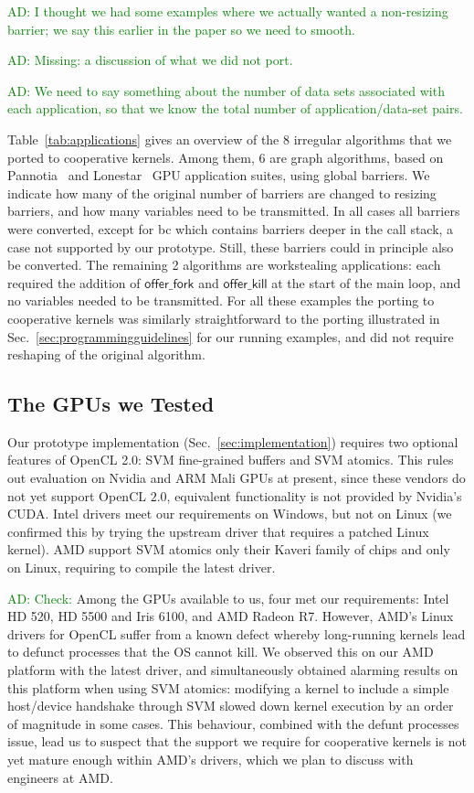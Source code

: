 \documentclass[numbers,nocopyrightspace,10pt]{sigplanconf}
\newcommand{\ADComment}[1]{\textcolor{green}{AD: #1}}
\newcommand{\mytablong}{Table~}
\newcommand{\mysec}{Sec.~}
\newcommand{\nvidia}{Nvidia\xspace}
\newcommand{\offerfork}{\mathsf{offer\_fork}}
\newcommand{\offerkill}{\mathsf{offer\_kill}}
\begin{document}
\ADComment{I thought we had some examples where we actually wanted a non-resizing barrier; we say this earlier in the paper so we need to smooth.}

\ADComment{Missing: a discussion of what we did not port.}

\ADComment{We need to say something about the number of data sets
  associated with each application, so that we know the total number
  of application/data-set pairs.}

\mytablong\ref{tab:applications} gives an overview of the 8 irregular
algorithms that we ported to cooperative kernels. Among them, 6 are
graph algorithms, based on Pannotia~\cite{...} and Lonestar~\cite{...} GPU application suites,
using global barriers.  We indicate how many of the original number of barriers are changed to resizing barriers, and how many variables need to
be transmitted.  In all cases all barriers were converted, except for bc
which contains barriers deeper in the call stack, a case not supported
by our prototype. Still, these barriers could in principle also be
converted.  The remaining 2 algorithms are workstealing applications:
each required the addition of $\offerfork$ and $\offerkill$ at the start
of the main loop, and no variables needed to be transmitted. For all
these examples the porting to cooperative kernels was similarly straightforward to the porting illustrated in \mysec\ref{sec:programmingguidelines} for our running examples, and did not require reshaping of the original algorithm.

\subsection{The GPUs we Tested}\label{sec:gpus}

Our prototype implementation (\mysec\ref{sec:implementation}) requires two optional features of OpenCL
2.0: SVM fine-grained buffers and SVM atomics. This rules out evaluation on \nvidia and ARM Mali GPUs at present, since
these vendors do not yet support OpenCL $2.0$, equivalent functionality is not provided by \nvidia's CUDA. Intel drivers meet our
requirements on Windows, but not on Linux (we confirmed this by trying the
upstream driver that requires a patched Linux kernel). AMD support SVM
atomics only their Kaveri family of chips and only on Linux, requiring
to compile the latest driver.

\ADComment{Check:} Among the GPUs available to us, four met our
requirements: Intel HD 520, HD 5500 and Iris 6100, and AMD Radeon R7.
However, AMD's Linux drivers for OpenCL suffer from a known defect
whereby long-running kernels lead to defunct processes that the OS
cannot kill.  We observed this on our AMD platform with the latest
driver, and simultaneously obtained alarming results on this platform
when using SVM atomics: modifying a kernel to include a simple
host/device handshake through SVM slowed down kernel execution by an
order of magnitude in some cases.  This behaviour, combined with the
defunt processes issue, lead us to suspect that the support we require
for cooperative kernels is not yet mature enough within AMD's drivers,
which we plan to discuss with engineers at AMD.
\end{document}
